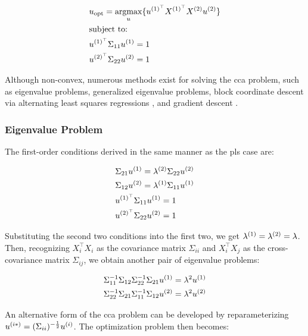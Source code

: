 \begin{align}
     & u_{\text{opt}}=\underset{u}{\mathrm{argmax}}\{ u^{(1)^{\top}}X^{(1)^{\top}}X^{(2)}u^{(2)} \} \\
     & \text{subject to:} \notag                                                                \\
     & u^{(1)^{\top}}\Sigma_{11}u^{(1)}=1 \notag                                                  \\
     & u^{(2)^{\top}}\Sigma_{22}u^{(2)}=1 \notag
\end{align}

Although non-convex, numerous methods exist for solving the \acrshort{cca} problem, such as eigenvalue problems, generalized eigenvalue problems, block coordinate descent via alternating least squares regressions \citep{golub1995canonical,sun2008least} , and gradient descent \citep{via2007learning}.

\subsubsection{Eigenvalue Problem}

The first-order conditions derived in the same manner as the \acrshort{pls} case are:

\begin{align}\label{CCA:FOCs}
     & \Sigma_{21}u^{(1)}=\lambda^{(2)} \Sigma_{22}u^{(2)} \\
     & \Sigma_{12}u^{(2)}=\lambda^{(1)} \Sigma_{11}u^{(1)} \\
     & u^{(1)^{\top}}\Sigma_{11}u^{(1)}=1                       \\
     & u^{(2)^{\top}}\Sigma_{22}u^{(2)}=1
\end{align}

Substituting the second two conditions into the first two, we get \(\lambda^{(1)}=\lambda^{(2)}=\lambda\). Then, recognizing \(X_i^{\top}X_i\) as the covariance matrix \(\Sigma_{ii}\) and \(X_i^{\top}X_j\) as the cross-covariance matrix \(\Sigma_{ij}\), we obtain another pair of eigenvalue problems:

\begin{align}
     & \Sigma_{11}^{-1}\Sigma_{12}\Sigma_{22}^{-1}\Sigma_{21}u^{(1)}=\lambda^2u^{(1)} \notag \\
     & \Sigma_{22}^{-1}\Sigma_{21}\Sigma_{11}^{-1}\Sigma_{12}u^{(2)}=\lambda^2u^{(2)} \notag
\end{align}

An alternative form of the \acrshort{cca} problem can be developed by reparameterizing \(u^{(i*)}=(\Sigma_{ii})^{-\frac{1}{2}}u^{(i)}\). The optimization problem then becomes:

